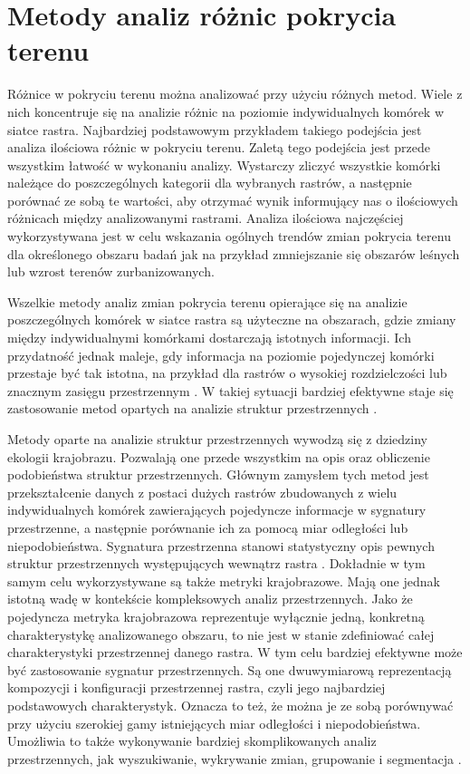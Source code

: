\documentclass{amuthesis}
\begin{document}
\hypertarget{metody-analiz-ruxf3ux17cnic-pokrycia-terenu}{%
\section{Metody analiz różnic pokrycia
terenu}\label{metody-analiz-ruxf3ux17cnic-pokrycia-terenu}}

Różnice w pokryciu terenu można analizować przy użyciu różnych metod.
Wiele z nich koncentruje się na analizie różnic na poziomie
indywidualnych komórek w siatce rastra. Najbardziej podstawowym
przykładem takiego podejścia jest analiza ilościowa różnic w pokryciu
terenu. Zaletą tego podejścia jest przede wszystkim łatwość w wykonaniu
analizy. Wystarczy zliczyć wszystkie komórki należące do poszczególnych
kategorii dla wybranych rastrów, a następnie porównać ze sobą te
wartości, aby otrzymać wynik informujący nas o ilościowych różnicach
między analizowanymi rastrami. Analiza ilościowa najczęściej
wykorzystywana jest w celu wskazania ogólnych trendów zmian pokrycia
terenu dla określonego obszaru badań jak na przykład zmniejszanie się
obszarów leśnych lub wzrost terenów zurbanizowanych.

Wszelkie metody analiz zmian pokrycia terenu opierające się na analizie
poszczególnych komórek w siatce rastra są użyteczne na obszarach, gdzie
zmiany między indywidualnymi komórkami dostarczają istotnych informacji.
Ich przydatność jednak maleje, gdy informacja na poziomie pojedynczej
komórki przestaje być tak istotna, na przykład dla rastrów o wysokiej
rozdzielczości lub znacznym zasięgu przestrzennym
\autocite{Jasiewicz_GeoPAT}. W takiej sytuacji bardziej efektywne staje
się zastosowanie metod opartych na analizie struktur przestrzennych
\autocite{Netzel2015}.

Metody oparte na analizie struktur przestrzennych wywodzą się z
dziedziny ekologii krajobrazu. Pozwalają one przede wszystkim na opis
oraz obliczenie podobieństwa struktur przestrzennych. Głównym zamysłem
tych metod jest przekształcenie danych z postaci dużych rastrów
zbudowanych z wielu indywidualnych komórek zawierających pojedyncze
informacje w sygnatury przestrzenne, a następnie porównanie ich za
pomocą miar odległości lub niepodobieństwa. Sygnatura przestrzenna
stanowi statystyczny opis pewnych struktur przestrzennych występujących
wewnątrz rastra \autocite{Jasiewicz_GeoPAT,nowosad_motif}. Dokładnie w
tym samym celu wykorzystywane są także metryki krajobrazowe. Mają one
jednak istotną wadę w kontekście kompleksowych analiz przestrzennych.
Jako że pojedyncza metryka krajobrazowa reprezentuje wyłącznie jedną,
konkretną charakterystykę analizowanego obszaru, to nie jest w stanie
zdefiniować całej charakterystyki przestrzennej danego rastra. W tym
celu bardziej efektywne może być zastosowanie sygnatur przestrzennych.
Są one dwuwymiarową reprezentacją kompozycji i konfiguracji
przestrzennej rastra, czyli jego najbardziej podstawowych
charakterystyk. Oznacza to też, że można je ze sobą porównywać przy
użyciu szerokiej gamy istniejących miar odległości i niepodobieństwa.
Umożliwia to także wykonywanie bardziej skomplikowanych analiz
przestrzennych, jak wyszukiwanie, wykrywanie zmian, grupowanie i
segmentacja \autocite{nowosad_motif}.
\end{document}
